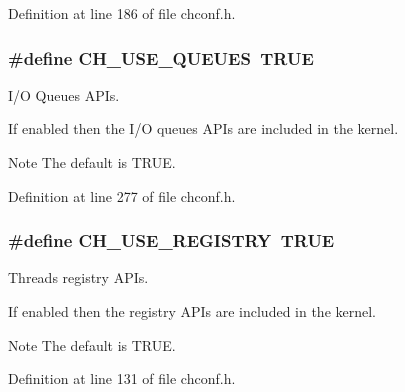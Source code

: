 Definition at line 186 of file chconf.\+h.

\hypertarget{group__config_gaabe4bd52d2fd1b180ebba1d1e8243051}{}
\subsubsection[{C\+H\+\_\+\+U\+S\+E\+\_\+\+Q\+U\+E\+U\+E\+S}]{\setlength{\rightskip}{0pt plus 5cm}\#define C\+H\+\_\+\+U\+S\+E\+\_\+\+Q\+U\+E\+U\+E\+S~T\+R\+U\+E}\label{group__config_gaabe4bd52d2fd1b180ebba1d1e8243051}


I/\+O Queues A\+P\+Is. 

If enabled then the I/\+O queues A\+P\+Is are included in the kernel.

\begin{DoxyNote}{Note}
The default is {\ttfamily T\+R\+U\+E}. 
\end{DoxyNote}


Definition at line 277 of file chconf.\+h.

\hypertarget{group__config_ga881045654c5c0b04081bf89da3fe4534}{}
\subsubsection[{C\+H\+\_\+\+U\+S\+E\+\_\+\+R\+E\+G\+I\+S\+T\+R\+Y}]{\setlength{\rightskip}{0pt plus 5cm}\#define C\+H\+\_\+\+U\+S\+E\+\_\+\+R\+E\+G\+I\+S\+T\+R\+Y~T\+R\+U\+E}\label{group__config_ga881045654c5c0b04081bf89da3fe4534}


Threads registry A\+P\+Is. 

If enabled then the registry A\+P\+Is are included in the kernel.

\begin{DoxyNote}{Note}
The default is {\ttfamily T\+R\+U\+E}. 
\end{DoxyNote}


Definition at line 131 of file chconf.\+h.

\hypertarget{group__config_gab88f410fdc6a67192194a8431d991b27}{}
